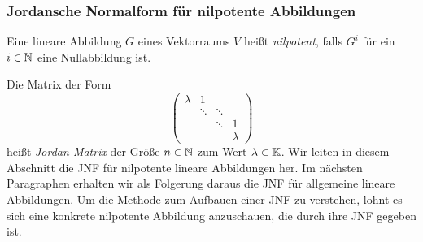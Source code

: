 \subsubsection{Jordansche Normalform für nilpotente Abbildungen}
\label{sec:6_4_8}

Eine lineare Abbildung $ G $ eines Vektorraums $ V $ heißt \emph{nilpotent}, falls $ G^i $ für ein $ i \in \mathbb N $ eine Nullabbildung ist. 

Die Matrix der Form
\begin{equation*}
	\begin{pmatrix}
		\lambda & 1 && \\
		& \ddots & \ddots & \\
		&& \ddots & 1 \\
		&&& \lambda
	\end{pmatrix}
\end{equation*}
heißt \emph{Jordan-Matrix} der Größe $ n \in \mathbb N $ zum Wert $ \lambda \in \mathbb K $. Wir leiten in diesem Abschnitt die JNF für nilpotente lineare Abbildungen her. Im nächsten Paragraphen erhalten wir als Folgerung daraus die JNF für allgemeine lineare Abbildungen. Um die Methode zum Aufbauen einer JNF zu verstehen, lohnt es sich eine konkrete nilpotente Abbildung anzuschauen, die durch ihre JNF gegeben ist. 

